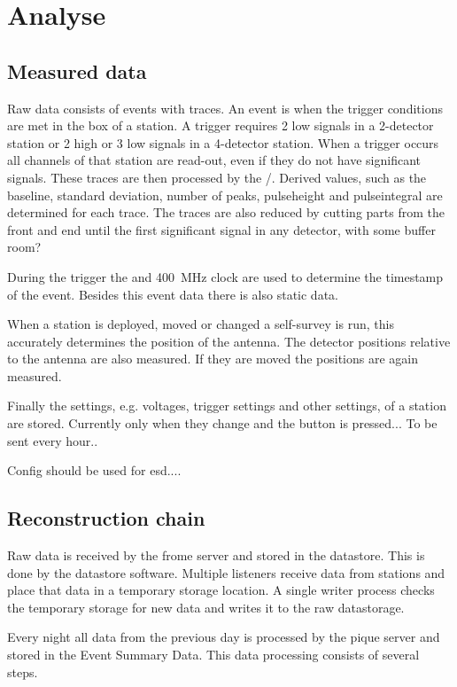 \chapter{Analyse}
\label{ch:analyse}


\section{Measured data}

Raw data consists of events with traces. An event is when the trigger
conditions are met in the \hisparc box of a station. A trigger requires
2 low signals in a 2-detector station or 2 high or 3 low signals in a
4-detector station. When a trigger occurs all \pmt channels of that
station are read-out, even if they do not have significant signals.
These traces are then processed by the \hisparcdaq/\pysparc. Derived
values, such as the baseline, standard deviation, number of peaks,
pulseheight and pulseintegral are determined for each trace. The traces
are also reduced by cutting parts from the front and end until the first
significant signal in any detector, with some buffer room?

During the trigger the \gps and \SI{400}{\mega\hertz} clock are used to
determine the \gps timestamp of the event. Besides this event data there
is also static data.

When a station is deployed, moved or changed a \gps self-survey is run,
this accurately determines the position of the \gps antenna. The
detector positions relative to the \gps antenna are also measured. If
they are moved the positions are again measured.

Finally the settings, e.g. \pmt voltages, trigger settings and other
settings, of a station are stored. Currently only when they change and
the button is pressed... To be sent every hour..

Config should be used for esd....


\section{Reconstruction chain}

Raw data is received by the frome server and stored in the \hisparc
datastore. This is done by the datastore software. Multiple listeners
receive data from stations and place that data in a temporary storage
location. A single writer process checks the temporary storage for new
data and writes it to the raw datastorage.

Every night all data from the previous day is processed by the pique
server and stored in the Event Summary Data. This data processing
consists of several steps.

